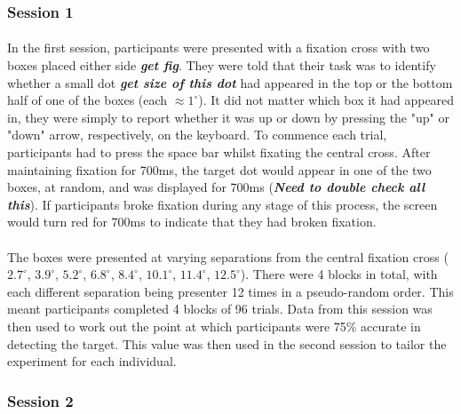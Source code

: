 \documentclass[12pt]{article}
\begin{document}
\subsubsection*{Session 1}
\paragraph{} In the first session, participants were presented with a fixation cross with two boxes placed either side \textit{\textbf{get fig}}. They were told that their task was to identify whether a small dot \textit{\textbf{get size of this dot}} had appeared in the top or the bottom half of one of the boxes (each $\approx1^{\circ}$). It did not matter which box it had appeared in, they were simply to report whether it was up or down by pressing the "up" or "down" arrow, respectively, on the keyboard. To commence each trial, participants had to press the space bar whilst fixating the central cross. After maintaining fixation for 700ms, the target dot would appear in one of the two boxes, at random, and was displayed for 700ms (\textit{\textbf{Need to double check all this}}). If participants broke fixation during any stage of this process, the screen would turn red for 700ms to indicate that they had broken fixation. 

\paragraph{} The boxes were presented at varying separations from the central fixation cross ($2.7^{\circ}$, $3.9^{\circ}$, $5.2^{\circ}$, $6.8^{\circ}$, $8.4^{\circ}$, $10.1^{\circ}$, $11.4^{\circ}$, $12.5^{\circ}$). There were 4 blocks in total, with each different separation being presenter 12 times in a pseudo-random order. This meant participants completed 4 blocks of 96 trials. Data from this session was then used to work out the point at which participants were 75\% accurate in detecting the target. This value was then used in the second session to tailor the experiment for each individual.

\subsubsection*{Session 2}  
\end{document}
